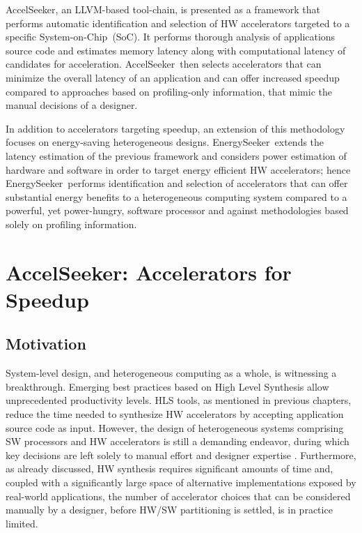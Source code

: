 \documentclass[]{usiinfthesis}
\newcommand{\aseeker}{{AccelSeeker}}
\newcommand{\eseeker}{{EnergySeeker}}
\newcommand{\HW}{{hardware}}
\newcommand{\SW}{{software}}
\newcommand{\SoC}{{System-on-Chip}}
\begin{document}
\aseeker, an LLVM-based tool-chain, is presented as a framework that performs automatic identification 
and selection of HW accelerators targeted to a specific \SoC\ (SoC).
It performs thorough analysis of applications source code and estimates memory latency along with 
computational latency of candidates for acceleration. \aseeker\ then selects accelerators that can minimize the
overall latency of an application and can offer increased speedup compared to approaches based 
on profiling-only information, that mimic the manual decisions of a designer.\par
In addition to accelerators targeting speedup, an extension of this methodology focuses on 
energy-saving 
heterogeneous designs. \eseeker\ extends the latency estimation of the previous framework and considers 
power estimation of hardware and software in order to target energy efficient HW accelerators; hence \eseeker\ 
performs identification and selection of accelerators that can offer substantial energy benefits to a 
heterogeneous computing system compared to a powerful, yet power-hungry, software processor and against methodologies based solely on profiling information.

% 
%
%
%
%

\section{\aseeker: Accelerators for Speedup}
\label{sec:accel}

\subsection{Motivation}

System-level design, and heterogeneous computing as a whole, is witnessing a breakthrough. 
Emerging best practices based on High Level Synthesis allow unprecedented productivity levels. 
HLS tools, as mentioned in previous chapters, reduce the time needed to synthesize HW accelerators
by accepting application source code as input.
However, the design of heterogeneous systems comprising SW processors and HW accelerators is 
still a demanding endeavor, during which key decisions are left solely to manual effort and 
designer expertise \cite{CacciottiSep18} \cite{NouriJun17}. 
Furthermore, as already discussed, 
HW synthesis requires significant amounts of time and, coupled with a significantly large space of alternative 
implementations exposed by real-world applications, the number of accelerator 
choices that can be considered manually by a designer, before HW/SW partitioning is settled, is in
practice limited.
\par
\end{document}
